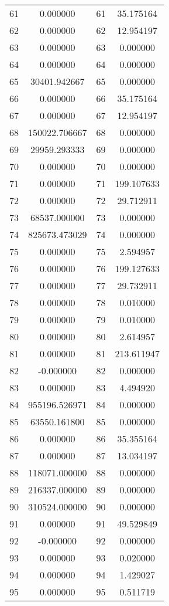 \documentclass[12pt]{article}
\begin{document}
\begin{longtable}{@{}cccc@{}}
61 & 0.000000 & 61 & 35.175164 \\
62 & 0.000000 & 62 & 12.954197 \\
63 & 0.000000 & 63 & 0.000000 \\
64 & 0.000000 & 64 & 0.000000 \\
65 & 30401.942667 & 65 & 0.000000 \\
66 & 0.000000 & 66 & 35.175164 \\
67 & 0.000000 & 67 & 12.954197 \\
68 & 150022.706667 & 68 & 0.000000 \\
69 & 29959.293333 & 69 & 0.000000 \\
70 & 0.000000 & 70 & 0.000000 \\
71 & 0.000000 & 71 & 199.107633 \\
72 & 0.000000 & 72 & 29.712911 \\
73 & 68537.000000 & 73 & 0.000000 \\
74 & 825673.473029 & 74 & 0.000000 \\
75 & 0.000000 & 75 & 2.594957 \\
76 & 0.000000 & 76 & 199.127633 \\
77 & 0.000000 & 77 & 29.732911 \\
78 & 0.000000 & 78 & 0.010000 \\
79 & 0.000000 & 79 & 0.010000 \\
80 & 0.000000 & 80 & 2.614957 \\
81 & 0.000000 & 81 & 213.611947 \\
82 & -0.000000 & 82 & 0.000000 \\
83 & 0.000000 & 83 & 4.494920 \\
84 & 955196.526971 & 84 & 0.000000 \\
85 & 63550.161800 & 85 & 0.000000 \\
86 & 0.000000 & 86 & 35.355164 \\
87 & 0.000000 & 87 & 13.034197 \\
88 & 118071.000000 & 88 & 0.000000 \\
89 & 216337.000000 & 89 & 0.000000 \\
90 & 310524.000000 & 90 & 0.000000 \\
91 & 0.000000 & 91 & 49.529849 \\
92 & -0.000000 & 92 & 0.000000 \\
93 & 0.000000 & 93 & 0.020000 \\
94 & 0.000000 & 94 & 1.429027 \\
95 & 0.000000 & 95 & 0.511719 \\

\end{longtable}
\end{document}
